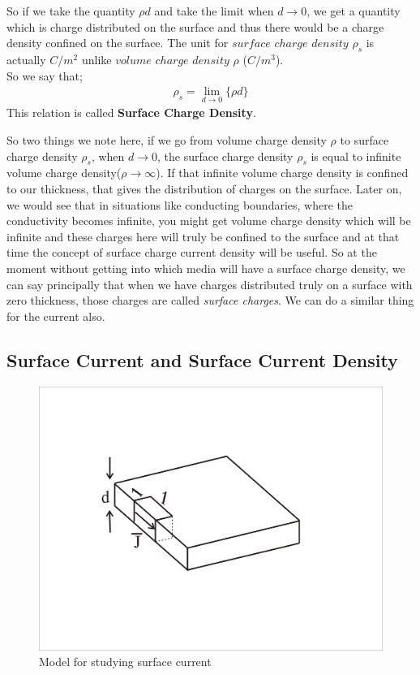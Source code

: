 So if we take the quantity $\rho d$ and take the limit when $d\rightarrow0$, we get a quantity which is charge distributed on the surface and thus there would be a charge density confined on the surface. The unit for $surface$ $charge$ $density$ $\rho_{s}$ is actually $C/m^{2}$ unlike $volume$ $charge$ $density$ $\rho$ ($C/m^{3}$).\\
So we say that;
\begin{align}
\rho_{s}=\lim_{d\rightarrow0}\{\rho d\} 
\end{align}
This relation is called \textbf{Surface Charge Density}.

So two things we note here, if we go from volume charge density $\rho$ to surface charge density $\rho_{s}$, when $d\rightarrow0$, the surface charge density $\rho_{s}$ is equal to infinite volume charge density($\rho\rightarrow\infty$). If that infinite volume charge density is confined to our thickness, that gives the distribution of charges on the surface. Later on, we would see that in situations like conducting boundaries, where the conductivity becomes infinite, you might get volume charge density which will be infinite and these charges here will truly be confined to the surface and at that time the concept of surface charge current density will be useful. So at the moment without getting into which media will have a surface charge density, we can say principally that when we have charges distributed truly on a surface with zero thickness, those charges are called \textit{surface charges}. We can do a similar thing for the current also.

\subsection{Surface Current and Surface Current Density}
\begin{figure}[h]
\centering
\includegraphics[width=0.7\linewidth]{graphics/surfacecurrent}
\caption{Model for studying surface current}
\end{figure} 


